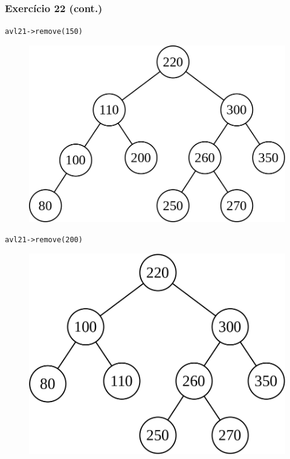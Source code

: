 \documentclass[aspectratio=169]{beamer}
\begin{document}
\begin{frame}[fragile]\frametitle{Exercício 22 (cont.)}
\texttt{avl21-\textgreater{}remove(150)}
\begin{figure}[h]
	\centering
	\includegraphics[height=0.25\paperheight]{imagens/avl-exercicio22f.png}
\end{figure}
\texttt{avl21-\textgreater{}remove(200)}
\begin{figure}[h]
	\centering
	\includegraphics[height=0.25\paperheight]{imagens/avl-exercicio22g.png}
\end{figure}
\end{frame}
\end{document}
